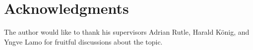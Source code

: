 \documentclass[a4paper]{easychair}
\begin{document}
\section{Acknowledgments} \label{sect:acks}
The author would like to thank his supervisors Adrian Rutle, Harald König, and Yngve Lamo for fruitful discussions about the topic.
\label{sect:bib}

%
%
%



\end{document}
